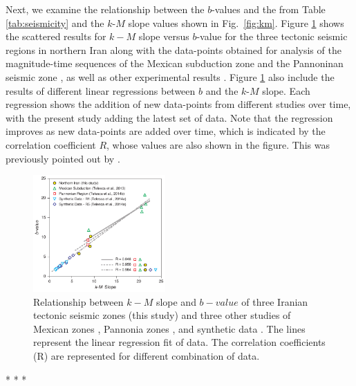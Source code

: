 Next, we examine the relationship between the $b$-values and the from Table \ref{tab:seismicity} and the $k$-$M$ slope values shown in Fig.~\ref{fig:km}. Figure \ref{fig:regression} shows the scattered results for $k-M$ slope versus $b$-value for the three tectonic seismic regions in northern Iran along with the data-points obtained for analysis of the magnitude-time sequences of the Mexican subduction zone \citep{Telesca2013} and the Pannoninan seismic zone \citep{Telesca2014}, as well as other experimental results \citep{Telesca2014-pone}. Figure \ref{fig:regression} also include the results of different linear regressions between $b$ and the $k$-$M$ slope. Each regression shows the addition of new data-points from different studies over time, with the present study adding the latest set of data. Note that the regression improves as new data-points are added over time, which is indicated by the correlation coefficient $R$, whose values are also shown in the figure. This was previously pointed out by \citet{Telesca2014}.

\begin{figure}[h]%
	\centering
	\includegraphics[width=0.45\textwidth]{figures/pdf/figure-07} 
	\caption{Relationship between $k-M$ slope and $b-value$ of three Iranian tectonic seismic zones (this study) and three other studies of Mexican zones \citep{Telesca2013}, Pannonia zones \citep{Telesca2014}, and synthetic data \citep{Telesca2014-pone}. The lines represent the linear regression fit of data. The correlation coefficients (R) are represented for different combination of data.}
	\label{fig:regression}
\end{figure}


\begin{center}
* \hspace{2em} * \hspace{2em} *
\end{center}

